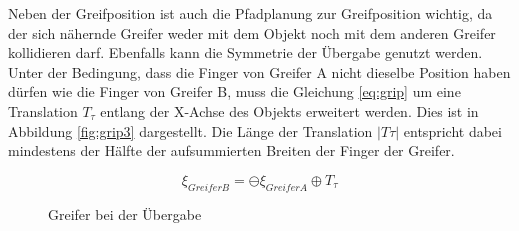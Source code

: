 Neben der Greifposition ist auch die Pfadplanung zur Greifposition wichtig, da der sich nähernde Greifer weder mit dem Objekt noch mit dem anderen Greifer kollidieren darf. Ebenfalls kann die Symmetrie der Übergabe genutzt werden. Unter der Bedingung, dass die Finger von Greifer A nicht dieselbe Position haben dürfen wie die Finger von Greifer B, muss die Gleichung \ref{eq:grip} um eine Translation $T_\tau$ entlang der X-Achse des Objekts erweitert werden. Dies ist in Abbildung \ref{fig:grip3} dargestellt. Die Länge der Translation $|T\tau|$ entspricht dabei mindestens der Hälfte der aufsummierten Breiten der Finger der Greifer.

\begin{equation}
\xi_{GreiferB} = \ominus \xi_{GreiferA} \oplus T_\tau
\label{eq:grip2}
\end{equation}

 \begin{figure}
 	\centering
 	\hfill
 	
 	\caption{Greifer bei der Übergabe}
 	\label{fig:grip}
 \end{figure}

